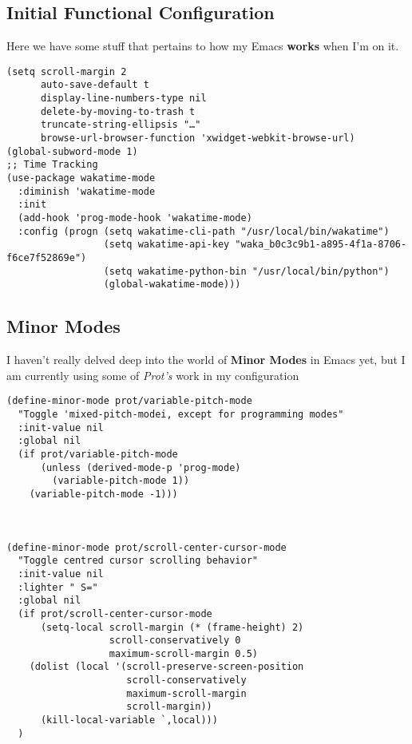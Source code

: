 \documentclass[11pt]{article}
\begin{document}
\subsection{Initial Functional Configuration}
\label{sec:org96a808e}
Here we have some stuff that pertains to how my Emacs \textbf{works} when I'm on it.
\begin{verbatim}
(setq scroll-margin 2
      auto-save-default t
      display-line-numbers-type nil
      delete-by-moving-to-trash t
      truncate-string-ellipsis "…"
      browse-url-browser-function 'xwidget-webkit-browse-url)
(global-subword-mode 1)
;; Time Tracking
(use-package wakatime-mode
  :diminish 'wakatime-mode
  :init
  (add-hook 'prog-mode-hook 'wakatime-mode)
  :config (progn (setq wakatime-cli-path "/usr/local/bin/wakatime")
                 (setq wakatime-api-key "waka_b0c3c9b1-a895-4f1a-8706-f6ce7f52869e")
                 (setq wakatime-python-bin "/usr/local/bin/python")
                 (global-wakatime-mode)))

\end{verbatim}
\subsection{Minor Modes}
\label{sec:org7ca6483}
I haven't really delved deep into the world of \textbf{Minor Modes} in Emacs yet, but I am currently using some of \emph{Prot's} work in my configuration
\begin{verbatim}
(define-minor-mode prot/variable-pitch-mode
  "Toggle 'mixed-pitch-modei, except for programming modes"
  :init-value nil
  :global nil
  (if prot/variable-pitch-mode
      (unless (derived-mode-p 'prog-mode)
        (variable-pitch-mode 1))
    (variable-pitch-mode -1)))



(define-minor-mode prot/scroll-center-cursor-mode
  "Toggle centred cursor scrolling behavior"
  :init-value nil
  :lighter " S="
  :global nil
  (if prot/scroll-center-cursor-mode
      (setq-local scroll-margin (* (frame-height) 2)
                  scroll-conservatively 0
                  maximum-scroll-margin 0.5)
    (dolist (local '(scroll-preserve-screen-position
                     scroll-conservatively
                     maximum-scroll-margin
                     scroll-margin))
      (kill-local-variable `,local)))
  )
\end{verbatim}
\end{document}
